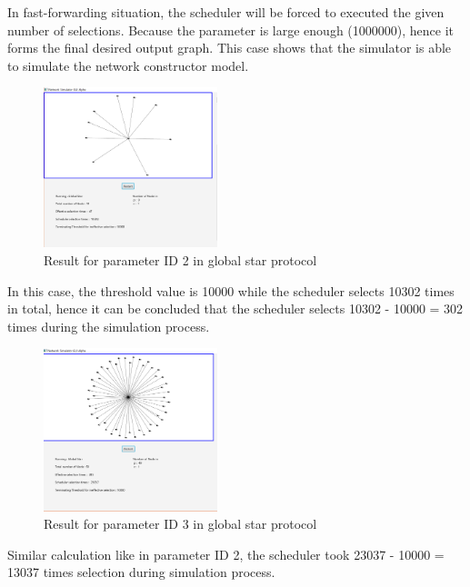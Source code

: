 \par\noindent
In fast-forwarding situation, the scheduler will be forced to executed the given number of selections.
Because the parameter is large enough (1000000), hence it forms the final desired output graph.
This case shows that the simulator is able to simulate the network constructor model.
\FloatBarrier
\begin{figure}[H]
\begin{center}
\includegraphics[width =0.45\textwidth]{context/diagram/GlobalStar_NoneFastForwarding10_Partial.png}
\caption{Result for parameter ID 2 in global star protocol}
\label{capture_star_res2}
\end{center}
\end{figure}
\par\noindent
In this case, the threshold value is 10000 while the scheduler selects 10302 times in total,
hence it can be concluded that the scheduler selects 10302 - 10000 = 302 times during the simulation process.
\FloatBarrier
\begin{figure}[H]
\begin{center}
\includegraphics[width =0.45\textwidth]{context/diagram/GlobalStar_NoneFastForwarding50_Partial.png}
\caption{Result for parameter ID 3 in global star protocol}
\label{capture_star_res3}
\end{center}
\end{figure}

\par\noindent
Similar calculation like in parameter ID 2, the scheduler took 23037 - 10000 = 13037 times selection during simulation process.

